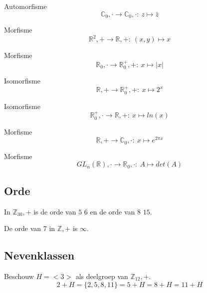 \documentclass[main.tex]{subfiles}
\begin{document}
\begin{vb}
  Automorfisme
  \[ \mathbb{C}_{0},\cdot \rightarrow \mathbb{C}_{0},\cdot:\ z \mapsto \bar{z} \]
\end{vb}

\begin{vb}
  Morfisme
  \[ \mathbb{R}^{2},+ \rightarrow \mathbb{R},+:\ (x,y) \mapsto x \]
\end{vb}

\begin{vb}
  Morfisme
  \[ \mathbb{R}_{0},\cdot \rightarrow \mathbb{R}^{+}_{0},+:\ x \mapsto |x| \]
\end{vb}

\begin{vb}
  Isomorfisme
  \[ \mathbb{R},+ \rightarrow \mathbb{R}^{+}_{0},+:\ x \mapsto 2^{x} \]
\end{vb}

\begin{vb}
  Isomorfisme
  \[ \mathbb{R}^{+}_{0},\cdot \rightarrow \mathbb{R},+:\ x \mapsto ln(x) \]
\end{vb}

\begin{vb}
  Morfisme
  \[ \mathbb{R},+ \rightarrow \mathbb{C}_{0},\cdot:\ x \mapsto e^{2\pi x} \]
\end{vb}

\begin{vb}
  Morfisme
  \[ GL_{n}(\mathbb{R}),\cdot \rightarrow \mathbb{R}_{0},\cdot:\ A \mapsto det(A) \]
\end{vb}


\subsection{Orde}


\begin{vb}
  In $\mathbb{Z}_{30},+$ is de orde van $5$ $6$ en de orde van $8$ $15$.
\end{vb}

\begin{vb}
  De orde van $7$ in $\mathbb{Z},+$ is $\infty$.
\end{vb}

\subsection{Nevenklassen}


\begin{vb}
  Beschouw $H= <3>$ als deelgroep van $\mathbb{Z}_{12},+$.
  \[ 2 + H = \{ 2,5,8,11 \} = 5 + H = 8 + H = 11 + H \]
\end{vb}
\end{document}
